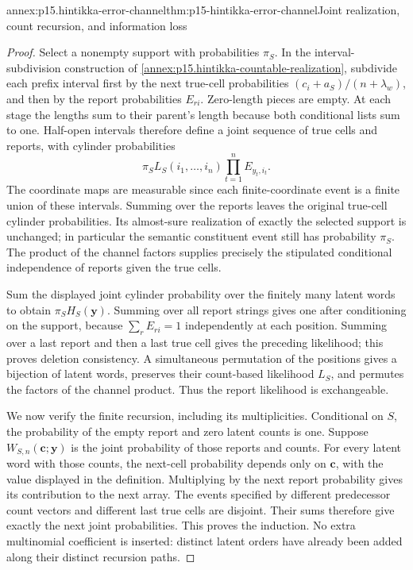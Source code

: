 \begin{annexitem}{annex:p15.hintikka-error-channel}{thm:p15-hintikka-error-channel}{Joint realization, count recursion, and information loss}
\begin{proof}
Select a nonempty support with probabilities \(\pi_S\). In the
interval-subdivision construction of
\cref{annex:p15.hintikka-countable-realization}, subdivide each prefix
interval first by the next true-cell probabilities
\((c_i+a_S)/(n+\lambda_w)\), and then by the report probabilities
\(E_{ri}\). Zero-length pieces are empty. At each stage the lengths
sum to their parent's length because both conditional lists sum to one.
Half-open intervals therefore define a joint sequence of true cells and
reports, with cylinder probabilities
\[
 \pi_S L_S(i_1,\ldots,i_n)\prod_{t=1}^n E_{y_t,i_t}.
\]
The coordinate maps are measurable since each finite-coordinate event
is a finite union of these intervals. Summing over the reports leaves
the original true-cell cylinder probabilities. Its almost-sure
realization of exactly the selected support is unchanged; in particular
the semantic constituent event still has probability \(\pi_S\).
The product of the channel factors supplies precisely the stipulated
conditional independence of reports given the true cells.

Sum the displayed joint cylinder probability over the finitely many
latent words to obtain \(\pi_SH_S(\boldsymbol y)\). Summing over
all report strings gives one after conditioning on the support, because
\(\sum_r E_{ri}=1\) independently at each position. Summing over a
last report and then a last true cell gives the preceding likelihood;
this proves deletion consistency. A simultaneous permutation of the
positions gives a bijection of latent words, preserves their count-based
likelihood \(L_S\), and permutes the factors of the channel product.
Thus the report likelihood is exchangeable.

We now verify the finite recursion, including its multiplicities.
Conditional on \(S\), the probability of the empty report and zero
latent counts is one. Suppose \(W_{S,n}(\boldsymbol c;\boldsymbol y)\)
is the joint probability of those reports and counts. For every latent
word with those counts, the next-cell probability depends only on
\(\boldsymbol c\), with the value displayed in the definition.
Multiplying by the next report probability gives its contribution to
the next array. The events specified by different predecessor count
vectors and different last true cells are disjoint. Their sums therefore
give exactly the next joint probabilities. This proves the induction.
No extra multinomial coefficient is inserted: distinct latent orders
have already been added along their distinct recursion paths.


\end{proof}
\end{annexitem}
